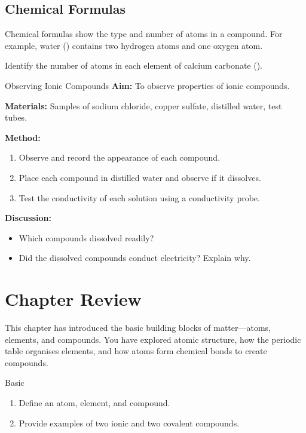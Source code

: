 \subsection{Chemical Formulas}

Chemical formulas show the type and number of atoms in a compound. For example, water () contains two hydrogen atoms and one oxygen atom.

\begin{stopandthink}
Identify the number of atoms in each element of calcium carbonate ().
\end{stopandthink}

\begin{investigation}{Observing Ionic Compounds}
\textbf{Aim:} To observe properties of ionic compounds.

\textbf{Materials:} Samples of sodium chloride, copper sulfate, distilled water, test tubes.

\textbf{Method:}
\begin{enumerate}
    \item Observe and record the appearance of each compound.
    \item Place each compound in distilled water and observe if it dissolves.
    \item Test the conductivity of each solution using a conductivity probe.
\end{enumerate}

\textbf{Discussion:}
\begin{itemize}
    \item Which compounds dissolved readily?
    \item Did the dissolved compounds conduct electricity? Explain why.
\end{itemize}
\end{investigation}

\section{Chapter Review}

This chapter has introduced the basic building blocks of matter—atoms, elements, and compounds. You have explored atomic structure, how the periodic table organises elements, and how atoms form chemical bonds to create compounds.

\begin{tieredquestions}{Basic}
\begin{enumerate}
    \item Define an atom, element, and compound.
    \item Provide examples of two ionic and two covalent compounds.
\end{enumerate}
\end{tieredquestions}

